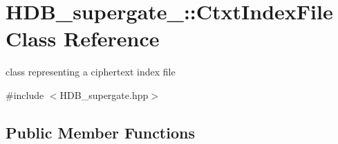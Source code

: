 \hypertarget{classHDB__supergate___1_1CtxtIndexFile}{}\section{H\+D\+B\+\_\+supergate\+\_\+\+:\+:Ctxt\+Index\+File Class Reference}
\label{classHDB__supergate___1_1CtxtIndexFile}


class representing a ciphertext index file  




{\ttfamily \#include $<$H\+D\+B\+\_\+supergate.\+hpp$>$}

\subsection*{Public Member Functions}
